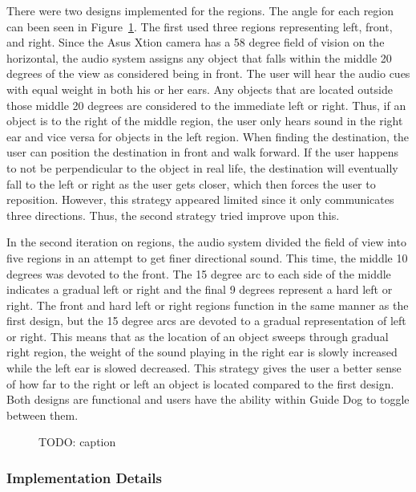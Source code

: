 There were two designs implemented for the regions. The angle for each region
can been seen in Figure~\ref{fig:regions}. The first used three regions
representing left, front, and right. Since the Asus Xtion camera has a 58 degree
field of vision on the horizontal, the audio system assigns any object that
falls within the middle 20 degrees of the view as considered being in front. The
user will hear the audio cues with equal weight in both his or her ears. Any
objects that are located outside those middle 20 degrees are considered to the
immediate left or right. Thus, if an object is to the right of the middle region,
the user only hears sound in the right ear and vice versa for objects in the
left region. When finding the destination, the user can position the destination
in front and walk forward. If the user happens to not be perpendicular to the
object in real life, the destination will eventually fall to the left or right
as the user gets closer, which then forces the user to reposition. However, this
strategy appeared limited since it only communicates three directions. Thus, the
second strategy tried improve upon this.

In the second iteration on regions, the audio system divided the field of view
into five regions in an attempt to get finer directional sound. This time, the
middle 10 degrees was devoted to the front. The 15 degree arc to each side of 
the middle indicates a gradual left or right and the final 9 degrees represent
a hard left or right. The front and hard left or right regions function in the 
same manner as the first design, but the 15 degree arcs are devoted to a gradual
representation of left or right. This means that as the location of an object
sweeps through gradual right region, the weight of the sound playing in the
right ear is slowly increased while the left ear is slowed decreased. This 
strategy gives the user a better sense of how far to the right or left an object
is located compared to the first design. Both designs are functional and users
have the ability within Guide Dog to toggle between them.

\begin{figure}
\caption{TODO: caption}
\label{fig:regions}
\end{figure}

\subsubsection{Implementation Details}
\label{sec:technical-audio-impl}

